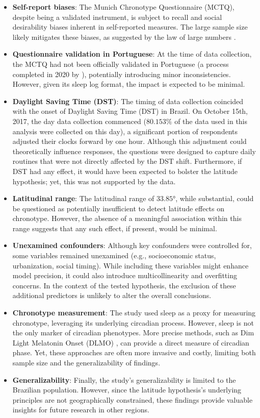 \documentclass[
12pt,
openright,
oneside,
a4paper,
chapter=TITLE,
section=TITLE,
french,
spanish,
brazil,
english
]{abntex2}
\providecommand{\tightlist}{
\setlength{\itemsep}{0ex}\setlength{\parskip}{0\baselineskip}}
\begin{document}
\begin{itemize}
\tightlist
\item
  \textbf{Self-report biases}: The Munich Chronotype Questionnaire
  (MCTQ), despite being a validated instrument, is subject to recall and
  social desirability biases inherent in self-reported measures. The
  large sample size likely mitigates these biases, as suggested by the
  law of large numbers \autocite[352]{degroot2012a}.
\item
  \textbf{Questionnaire validation in Portuguese}: At the time of data
  collection, the MCTQ had not been officially validated in Portuguese
  (a process completed in 2020 by \textcite{reis2020a}), potentially
  introducing minor inconsistencies. However, given its sleep log
  format, the impact is expected to be minimal.
\item
  \textbf{Daylight Saving Time (DST)}: The timing of data collection
  coincided with the onset of Daylight Saving Time (DST) in Brazil. On
  October 15th, 2017, the day data collection commenced (\(80.153\%\) of
  the data used in this analysis were collected on this day), a
  significant portion of respondents adjusted their clocks forward by
  one hour. Although this adjustment could theoretically influence
  responses, the questions were designed to capture daily routines that
  were not directly affected by the DST shift. Furthermore, if DST had
  any effect, it would have been expected to bolster the latitude
  hypothesis; yet, this was not supported by the data.
\item
  \textbf{Latitudinal range}: The latitudinal range of \(33.85°\), while
  substantial, could be questioned as potentially insufficient to detect
  latitude effects on chronotype. However, the absence of a meaningful
  association within this range suggests that any such effect, if
  present, would be minimal.
\item
  \textbf{Unexamined confounders}: Although key confounders were
  controlled for, some variables remained unexamined (e.g.,
  socioeconomic status, urbanization, social timing). While including
  these variables might enhance model precision, it could also introduce
  multicollinearity and overfitting concerns. In the context of the
  tested hypothesis, the exclusion of these additional predictors is
  unlikely to alter the overall conclusions.
\item
  \textbf{Chronotype measurement}: The study used sleep as a proxy for
  measuring chronotype, leveraging its underlying circadian process.
  However, sleep is not the only marker of circadian phenotypes. More
  precise methods, such as Dim Light Melatonin Onset (DLMO)
  \autocite{ruiz2020}, can provide a direct measure of circadian phase.
  Yet, these approaches are often more invasive and costly, limiting
  both sample size and the generalizability of findings.
\item
  \textbf{Generalizability}: Finally, the study's generalizability is
  limited to the Brazilian population. However, since the latitude
  hypothesis's underlying principles are not geographically constrained,
  these findings provide valuable insights for future research in other
  regions.
\end{itemize}
\end{document}
